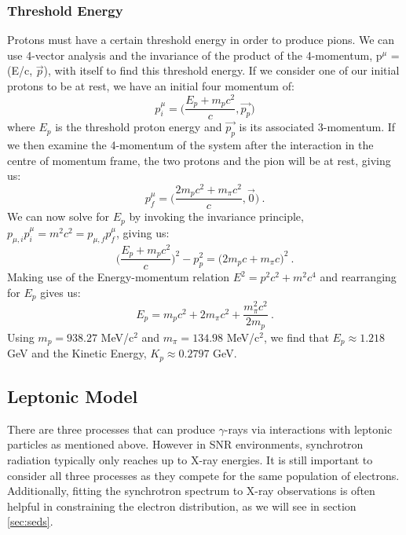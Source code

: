 \documentclass[12pt,a4paper]{article}
\begin{document}
\subsubsection{Threshold Energy}
Protons must have a certain threshold energy in order to produce pions. We can use 4-vector analysis and the invariance of the product of the 4-momentum, p$^{\mu}$ = (E/c, $\vec{p}$), with itself to find this threshold energy. If we consider one of our initial protons to be at rest, we have an initial four momentum of:
\begin{equation}
p^{\mu}_i = \bigg(\dfrac{E_p + m_p c^2}{c}, \vec{p_p}\bigg)
\end{equation}
where $E_p$ is the threshold proton energy and $\vec{p_p}$ is its associated 3-momentum. If we then examine the 4-momentum of the system after the interaction in the centre of momentum frame, the two protons and the pion will be at rest, giving us:
\begin{equation}
p^{\mu}_f = \bigg(\dfrac{2m_p c^2 + m_{\pi} c^2}{c}, \vec{0}\bigg) \ .
\end{equation}
We can now solve for $E_p$ by invoking the invariance principle, $p_{\mu, i} p^{\mu}_i = m^2c^2 = p_{\mu, f} p^{\mu}_f$, giving us:
\begin{equation}
\bigg(\dfrac{E_p + m_p c^2}{c}\bigg)^2 - p^2_p = \bigg(2m_p c + m_{\pi} c\bigg)^2 \ .
\end{equation}
Making use of the Energy-momentum relation $E^2 = p^2c^2 + m^2 c^4$ and rearranging for $E_p$ gives us:
\begin{equation} \label{eq:7}
E_p = m_p c^2 + 2m_{\pi} c^2 + \dfrac{m_{\pi}^2 c^2}{2m_p} \ .
\end{equation}
Using $m_p =  938.27$ MeV/c$^2$ and $m_{\pi} =  134.98$ MeV/c$^2$, we find that $E_p \approx 1.218$ GeV and the Kinetic Energy, $K_p \approx 0.2797$ GeV.\\

\subsection{Leptonic Model}
There are three processes that can produce $\gamma$-rays via interactions with leptonic particles as mentioned above. However in SNR environments, synchrotron radiation typically only reaches up to X-ray energies. It is still important to consider all three processes as they compete for the same population of electrons. Additionally, fitting the synchrotron spectrum to X-ray observations is often helpful in constraining the electron distribution, as we will see in section \ref{sec:seds}.
\end{document}
